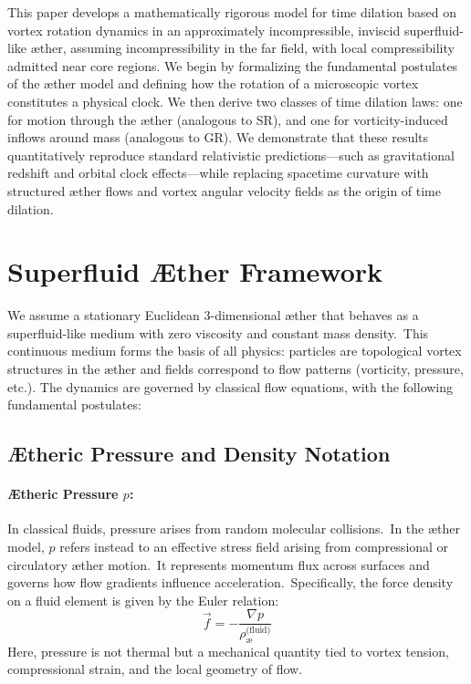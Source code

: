 \documentclass[a4paper,12pt]{article}
\begin{document}
This paper develops a mathematically rigorous model for time dilation based on vortex rotation dynamics in an approximately incompressible, inviscid superfluid-like æther, assuming incompressibility in the far field, with local compressibility admitted near core regions. We begin by formalizing the fundamental postulates of the æther model and defining how the rotation of a microscopic vortex constitutes a physical clock. We then derive two classes of time dilation laws: one for motion through the æther (analogous to SR), and one for vorticity-induced inflows around mass (analogous to GR). We demonstrate that these results quantitatively reproduce standard relativistic predictions—such as gravitational redshift and orbital clock effects—while replacing spacetime curvature with structured æther flows and vortex angular velocity fields as the origin of time dilation.
\section{Superfluid Æther Framework}

We assume a stationary Euclidean 3-dimensional æther that behaves as a superfluid-like medium with zero viscosity and constant mass density.\ This continuous medium forms the basis of all physics: particles are topological vortex structures in the æther and fields correspond to flow patterns (vorticity, pressure, etc.). The dynamics are governed by classical flow equations, with the following fundamental postulates:

\vspace{1em}
\subsection*{Ætheric Pressure and Density Notation}

\paragraph{Ætheric Pressure \textbf{\( p \)}:}
In classical fluids, pressure arises from random molecular collisions.\ In the æther model,  \textbf{\( p \)} refers instead to an effective stress field arising from compressional or circulatory æther motion.\ It represents momentum flux across surfaces and governs how flow gradients influence acceleration.\ Specifically, the force density on a fluid element is given by the Euler relation:
\[
\vec{f} = -\frac{\nabla p}{\rho^{\text{(fluid)}}_{\text{\ae}}}
\]
Here, pressure is not thermal but a mechanical quantity tied to vortex tension, compressional strain, and the local geometry of flow.
\end{document}

